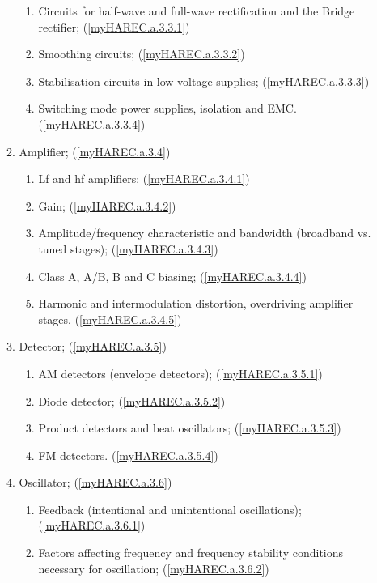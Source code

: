 \begin{enumerate}
\begin{enumerate}[noitemsep]
\begin{enumerate}[noitemsep]
\item Circuits for half-wave and full-wave rectification and the Bridge rectifier; (\ref{myHAREC.a.3.3.1})\label{HAREC.a.3.3.1}
\item Smoothing circuits; (\ref{myHAREC.a.3.3.2})\label{HAREC.a.3.3.2}
\item Stabilisation circuits in low voltage supplies; (\ref{myHAREC.a.3.3.3})\label{HAREC.a.3.3.3}
\item Switching mode power supplies, isolation and EMC. (\ref{myHAREC.a.3.3.4})\label{HAREC.a.3.3.4}
\end{enumerate}
\item Amplifier; (\ref{myHAREC.a.3.4})\label{HAREC.a.3.4}
\begin{enumerate}[noitemsep]
\item Lf and hf amplifiers; (\ref{myHAREC.a.3.4.1})\label{HAREC.a.3.4.1}
\item Gain; (\ref{myHAREC.a.3.4.2})\label{HAREC.a.3.4.2}
\item Amplitude/frequency characteristic and bandwidth (broadband vs. tuned stages); (\ref{myHAREC.a.3.4.3})\label{HAREC.a.3.4.3}
\item Class A, A/B, B and C biasing; (\ref{myHAREC.a.3.4.4})\label{HAREC.a.3.4.4}
\item Harmonic and intermodulation distortion, overdriving amplifier stages. (\ref{myHAREC.a.3.4.5})\label{HAREC.a.3.4.5}
\end{enumerate}
\item Detector; (\ref{myHAREC.a.3.5})\label{HAREC.a.3.5}
\begin{enumerate}[noitemsep]
\item AM detectors (envelope detectors); (\ref{myHAREC.a.3.5.1})\label{HAREC.a.3.5.1}
\item Diode detector; (\ref{myHAREC.a.3.5.2})\label{HAREC.a.3.5.2}
\item Product detectors and beat oscillators; (\ref{myHAREC.a.3.5.3})\label{HAREC.a.3.5.3}
\item FM detectors. (\ref{myHAREC.a.3.5.4})\label{HAREC.a.3.5.4}
\end{enumerate}
\item Oscillator; (\ref{myHAREC.a.3.6})\label{HAREC.a.3.6}
\begin{enumerate}[noitemsep]
\item Feedback (intentional and unintentional oscillations); (\ref{myHAREC.a.3.6.1})\label{HAREC.a.3.6.1}
\item Factors affecting frequency and frequency stability conditions necessary for oscillation; (\ref{myHAREC.a.3.6.2})\label{HAREC.a.3.6.2}

\end{enumerate}
\end{enumerate}
\end{enumerate}
